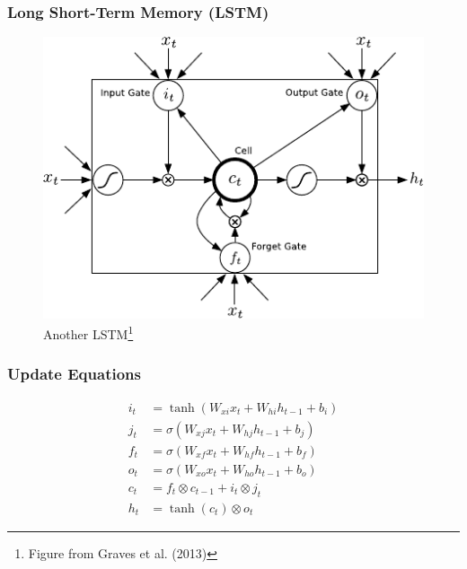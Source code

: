 \documentclass[utf8x,hyperref={pdfpagelabels=false}]{beamer}
\begin{document}
\begin{frame}
\frametitle{Long Short-Term Memory (LSTM)}
\begin{figure}[t]
\centering
\includegraphics[scale=1.0]{lstmgraves}
\caption{Another LSTM\footnote{Figure from Graves et al. (2013)}}
\end{figure}
\end{frame}

\begin{frame}
    \frametitle{Update Equations}
    \begin{align*}
        i_t &= \tanh(W_{xi}x_t + W_{hi}h_{t-1} + b_i)\\
        j_t &= \sigma(W_{xj}x_t + W_{hj}h_{t-1} + b_j)\\
        f_t &= \sigma(W_{xf}x_t + W_{hf}h_{t-1} + b_f)\\
        o_t &= \sigma(W_{xo}x_t + W_{ho}h_{t-1} + b_o)\\
        c_t &= f_t \otimes c_{t-1} + i_t \otimes j_t\\
        h_t &= \tanh(c_t) \otimes o_t
    \end{align*}
\end{frame}
\end{document}
